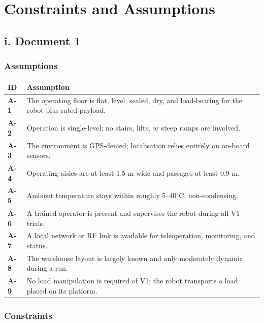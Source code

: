 \chapter{Constraints and Assumptions}

\section*{i. Document 1}

\subsection*{Assumptions}

\begin{table}[H]
\centering
\begin{tabularx}{\textwidth}{>{\bfseries}L{0.12\textwidth}Y}
\toprule
ID & Assumption \\
\midrule
A-1 & The operating floor is flat, level, sealed, dry, and load-bearing for the robot plus rated payload. \\
A-2 & Operation is single-level; no stairs, lifts, or steep ramps are involved. \\
A-3 & The environment is GPS-denied; localisation relies entirely on on-board sensors. \\
A-4 & Operating aisles are at least 1.5 m wide and passages at least 0.9 m. \\
A-5 & Ambient temperature stays within roughly 5--40$^\circ$C, non-condensing. \\
A-6 & A trained operator is present and supervises the robot during all V1 trials. \\
A-7 & A local network or RF link is available for teleoperation, monitoring, and status. \\
A-8 & The warehouse layout is largely known and only moderately dynamic during a run. \\
A-9 & No load manipulation is required of V1; the robot transports a load placed on its platform. \\
\bottomrule
\end{tabularx}
\end{table}

\subsection*{Constraints}

